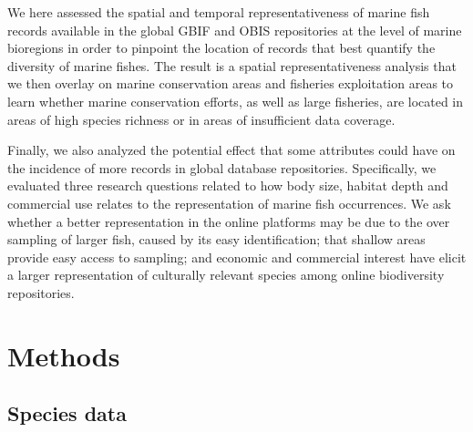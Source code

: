\documentclass[12pt,authoryear]{elsarticle}
\begin{document}
We here assessed the spatial and temporal representativeness of marine fish records available in the global GBIF and OBIS repositories at the level of marine bioregions in order to pinpoint the location of records that best quantify the diversity of marine fishes. The result is a spatial representativeness analysis that we then overlay on marine conservation areas \citep{wcmc2022} and fisheries exploitation areas \citep{fao2014} to learn whether marine conservation efforts, as well as large fisheries, are located in areas of high species richness or in areas of insufficient data coverage. 

Finally, we also analyzed the potential effect that some attributes could have on the incidence of more records in global database repositories. Specifically, we evaluated three research questions related to how body size, habitat depth and commercial use relates to the representation of marine fish occurrences. We ask whether a better representation in the online platforms may be due to the over sampling of larger fish, caused by its easy identification; that shallow areas provide easy access to sampling; and economic and commercial interest have elicit a larger representation of culturally relevant species among online biodiversity repositories.  

\section{Methods}
\subsection{Species data}
\label{sec:spp-data}
\end{document}
